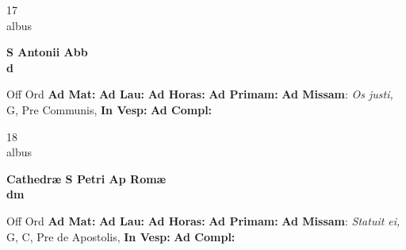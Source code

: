 \documentclass[10pt, openany]{book}
\begin{document}
    \begin{center}
        \begin{minipage}{3.5in}
            \vspace{2em}
            \begin{minipage}{0.5in}
                {\Huge 17} \\
                {\normalsize albus}
            \end{minipage}
            \begin{minipage}{3.0in}
                \textbf{ \large S Antonii Abb \\
                \textnormal{\normalsize d}}

            \end{minipage}
            \begin{justify}Off Ord
                \textbf{Ad Mat: }
                \textbf{Ad Lau: }
                \textbf{Ad Horas: }
                \textbf{Ad Primam: }\textbf{Ad Missam}: \textit{Os justi,} G, Pre Communis, 
                \textbf{In Vesp: }
                \textbf{Ad Compl: }
            \end{justify}
        \end{minipage}
    \end{center}

    \begin{center}
        \begin{minipage}{3.5in}
            \vspace{2em}
            \begin{minipage}{0.5in}
                {\Huge 18} \\
                {\normalsize albus}
            \end{minipage}
            \begin{minipage}{3.0in}
                \textbf{ \large Cathedræ S Petri Ap Romæ \\
                \textnormal{\normalsize dm}}

            \end{minipage}
            \begin{justify}Off Ord
                \textbf{Ad Mat: }
                \textbf{Ad Lau: }
                \textbf{Ad Horas: }
                \textbf{Ad Primam: }\textbf{Ad Missam}: \textit{Statuit ei,} G, C, Pre de Apostolis, 
                \textbf{In Vesp: }
                \textbf{Ad Compl: }
            \end{justify}
        \end{minipage}
    \end{center}
\end{document}
